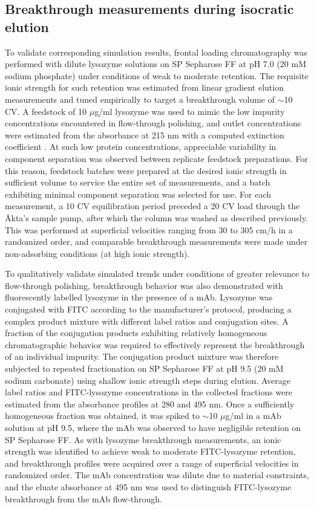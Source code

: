 \documentclass[preprint,review,12pt]{elsarticle}
\begin{document}
    \subsection{Breakthrough measurements during isocratic elution} \label{ssec:exp_breakthrough}
        To validate corresponding simulation results, frontal loading chromatography was performed with dilute lysozyme solutions on SP Sepharose FF at pH 7.0 (20 mM sodium phosphate) under conditions of weak to moderate retention. The requisite ionic strength for such retention was estimated from linear gradient elution measurements and tuned empirically to target a breakthrough volume of $\sim$10 CV. A feedstock of 10 $\mu$g/ml lysozyme was used to mimic the low impurity concentrations encountered in flow-through polishing, and outlet concentrations were estimated from the absorbance at 215 nm with a computed extinction coefficient \cite{Kuipers2007}. At such low protein concentrations, appreciable variability in component separation was observed between replicate feedstock preparations. For this reason, feedstock batches were  prepared at the desired ionic strength in sufficient volume to service the entire set of measurements, and a batch exhibiting minimal component separation was selected for use. For each measurement, a 10 CV equilibration period preceded a 20 CV load through the \"{A}kta's sample pump, after which the column was washed as described previously. This was performed at superficial velocities ranging from 30 to 305 cm/h in a randomized order, and comparable breakthrough measurements were made under non-adsorbing conditions (at high ionic strength).


        To qualitatively validate simulated trends under conditions of greater relevance to flow-through polishing, breakthrough behavior was also demonstrated with fluorescently labelled lysozyme in the presence of a mAb. Lysozyme was conjugated with FITC according to the manufacturer's protocol, producing a complex product mixture with different label ratios and conjugation sites. A fraction of the conjugation products exhibiting relatively homogeneous chromatographic behavior was required to effectively represent the breakthrough of an individual impurity. The conjugation product mixture was therefore subjected to repeated fractionation on SP Sepharose FF at pH 9.5 (20 mM sodium carbonate) using shallow ionic strength steps during elution. Average label ratios and FITC-lysozyme concentrations in the collected fractions were estimated from the absorbance profiles at 280 and 495 nm. Once a sufficiently homogeneous fraction was obtained, it was spiked to $\sim$10 $\mu$g/ml in a mAb solution at pH 9.5, where the mAb was observed to have negligible retention on SP Sepharose FF. As with lysozyme breakthrough measurements, an ionic strength was identified to achieve weak to moderate FITC-lysozyme retention, and breakthrough profiles were acquired over a range of superficial velocities in randomized order. The mAb concentration was dilute due to material constraints, and the eluate absorbance at 495 nm was used to distinguish FITC-lysozyme breakthrough from the mAb flow-through.
\end{document}
